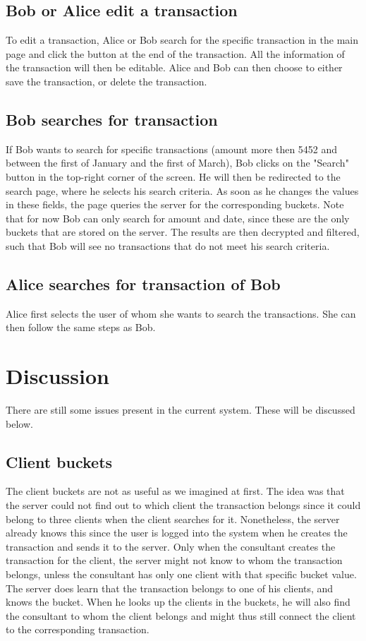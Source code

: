 \documentclass[a4paper]{article}
\begin{document}
    \subsection{Bob or Alice edit a transaction}
    	To edit a transaction, Alice or Bob search for the specific transaction in the main page and click the button at the end of the transaction. All the information of the transaction will then be editable. Alice and Bob can then choose to either save the transaction, or delete the transaction. 
    
    \subsection{Bob searches for transaction}
    	If Bob wants to search for specific transactions (amount more then 5452 and between the first of January and the first of March), Bob clicks on the "Search" button in the top-right corner of the screen. He will then be redirected to the search page, where he selects his search criteria. As soon as he changes the values in these fields, the page queries the server for the corresponding buckets. Note that for now Bob can only search for amount and date, since these are the only buckets that are stored on the server. The results are then decrypted and filtered, such that Bob will see no transactions that do not meet his search criteria.
    
    \subsection{Alice searches for transaction of Bob}
    	Alice first selects the user of whom she wants to search the transactions. She can then follow the same steps as Bob.
         
\section{Discussion}
	There are still some issues present in the current system. These will be discussed below. 
    
    \subsection{Client buckets}
    	The client buckets are not as useful as we imagined at first. The idea was that the server could not find out to which client the transaction belongs since it could belong to three clients when the client searches for it. Nonetheless, the server already knows this since the user is logged into the system when he creates the transaction and sends it to the server. Only when the consultant creates the transaction for the client, the server might not know to whom the transaction belongs, unless the consultant has only one client with that specific bucket value. The server does learn that the transaction belongs to one of his clients, and knows the bucket. When he looks up the clients in the buckets, he will also find the consultant to whom the client belongs and might thus still connect the client to the corresponding transaction. 
    
\end{document}
